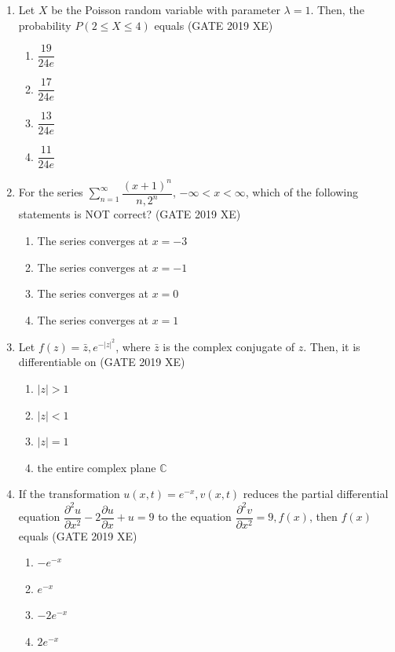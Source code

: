 \documentclass[journal,12pt,onecolumn]{IEEEtran}
\begin{document}
\begin{enumerate}
\item Let $X$ be the Poisson random variable with parameter $\lambda=1$. Then, the probability $P(2 \le X \le 4)$ equals
\hfill{(GATE 2019 XE)} \\
\begin{multicols}{2}
\begin{enumerate}
\item $\dfrac{19}{24e}$
\item $\dfrac{17}{24e}$
\item $\dfrac{13}{24e}$
\item $\dfrac{11}{24e}$
\end{enumerate}
\end{multicols}

\item For the series $\sum_{n=1}^{\infty}\dfrac{(x+1)^n}{n,2^n}$, $-\infty<x<\infty$, which of the following statements is NOT correct?
\hfill{(GATE 2019 XE)} \\
\begin{multicols}{2}
\begin{enumerate}
\item The series converges at $x=-3$
\item The series converges at $x=-1$
\item The series converges at $x=0$
\item The series converges at $x=1$
\end{enumerate}
\end{multicols}

\item Let $f(z)=\bar{z}, e^{-|z|^2}$, where $\bar{z}$ is the complex conjugate of $z$. Then, it is differentiable on
\hfill{(GATE 2019 XE)} \\
\begin{multicols}{2}
\begin{enumerate}
\item $|z|>1$
\item $|z|<1$
\item $|z|=1$
\item the entire complex plane $\mathbb{C}$
\end{enumerate}
\end{multicols}

\item If the transformation $u(x,t)=e^{-x},v(x,t)$ reduces the partial differential equation $\dfrac{\partial^2 u}{\partial x^2}-2\dfrac{\partial u}{\partial x}+u=9$ to the equation $\dfrac{\partial^2 v}{\partial x^2}=9,f(x)$, then $f(x)$ equals
\hfill{(GATE 2019 XE)} \\
\begin{multicols}{2}
\begin{enumerate}
\item $-e^{-x}$
\item $e^{-x}$
\item $-2e^{-x}$
\item $2e^{-x}$
\end{enumerate}
\end{multicols}


\end{enumerate}
\end{document}
